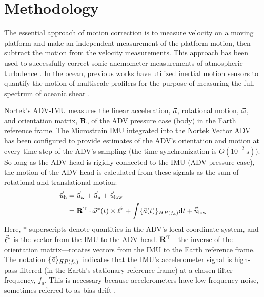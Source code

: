 
\section{Methodology}
\label{sec:methods}


\def\ue{\ensuremath{\vec{\tilde{u}}\earth}}


The essential approach of motion correction is to measure velocity on a moving platform and make an independent measurement of the platform motion, then subtract the motion from the velocity measurements. This approach has been used to successfully correct sonic anemometer measurements of atmospheric turbulence \cite[e.g., ][]{Edson++1998, Miller++2008}.  In the ocean, previous works have utilized inertial motion sensors to quantify the motion of multiscale profilers for the purpose of measuring the full spectrum of oceanic shear \cite[]{Winkel++1996}.

Nortek's ADV-IMU measures the linear acceleration, ${\vec{a}}$, rotational motion, $\vec{\omega}$, and orientation matrix, $\mathbf{R}$, of the ADV pressure case (body) in the Earth reference frame. The Microstrain IMU integrated into the Nortek Vector ADV has been configured to provide estimates of the ADV's orientation and motion at every time step of the ADV's sampling (the time synchronization is $O(10^{-2}\ \mathrm{s})$). So long as the ADV head is rigidly connected to the IMU (ADV pressure case), the motion of the ADV head is calculated from these signals as the sum of rotational and translational motion:
\begin{align}
  \label{eqn:uhead}
\begin{split}
  \uhead & = \urot + \uacc + \ulow \\
      & = \omatinv \cdot \AngRt^*(t)\times\l + \int \{\Accel(t)\}_{HP(f_{a})} \mathrm{d}t + \ulow
\end{split}
\end{align}
Here, $*$ superscripts denote quantities in the ADV's local coordinate system, and $\vec{\ell}^*$ is the vector from the IMU to the ADV head. $\mathbf{R}^\mathrm{T}$---the inverse of the orientation matrix---rotates vectors from the IMU to the Earth reference frame. The notation $\{{\vec{a}}\}_{HP(f_a)}$ indicates that the IMU's accelerometer signal is high-pass filtered (in the Earth's stationary reference frame) at a chosen filter frequency, $f_a$. This is necessary because accelerometers have low-frequency noise, sometimes referred to as bias drift \cite[]{Barshan+Whyte1995, Bevly2004, Gulmammadov2009}.

